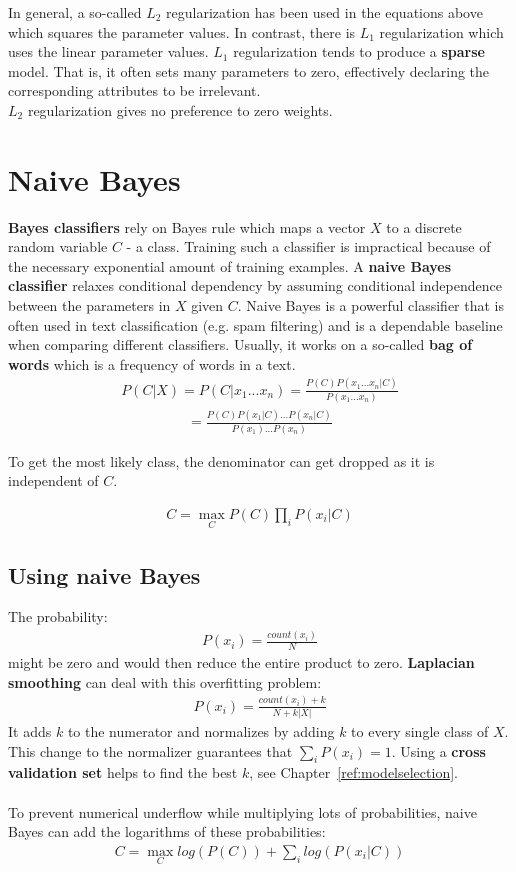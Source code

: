 \documentclass{report}
\begin{document}
In general, a so-called $L_2$ regularization has been used in the equations above which squares the parameter values.
In contrast, there is $L_1$ regularization which uses the linear parameter values.
$L_1$ regularization tends to produce a {\bf sparse} model.
That is, it often sets many parameters to zero, effectively declaring the corresponding attributes to be irrelevant. \\
$L_2$ regularization gives no preference to zero weights.


\section{Naive Bayes}
{\bf Bayes classifiers} rely on Bayes rule which maps a vector $X$ to a discrete random variable $C$ - a class. Training such a classifier is impractical because of the necessary exponential amount of training examples. A {\bf naive Bayes classifier} relaxes conditional dependency by assuming conditional independence between the parameters in $X$ given $C$. Naive Bayes is a powerful classifier that is often used in text classification (e.g. spam filtering) and is a dependable baseline when comparing different classifiers. Usually, it works on a so-called {\bf bag of words} which is a frequency of words in a text.
\begin{align*}
P(C\vert X) = P(C\vert x_1...x_n) = \frac{P(C)P(x_1...x_n\vert C)}{P(x_1...x_n)}
\end{align*}
\begin{align*}
= \frac{P(C)P(x_1\vert C)...P(x_n\vert C)}{P(x_1)...P(x_n)}
\end{align*}

To get the most likely class, the denominator can get dropped as it is independent of $C$.

\begin{align*}
C = \max\limits_{C} P(C)\prod_iP(x_i\vert C)
\end{align*}

\subsection{Using naive Bayes}
\label{chapter:usingnaivebayes}
The probability:
\begin{align*}
P(x_i) = \frac{count(x_i)}{N}
\end{align*}
might be zero and would then reduce the entire product to zero. {\bf Laplacian smoothing} can deal with this overfitting problem:
\begin{align*}
P(x_i) = \frac{count(x_i)+k}{N+k\vert X\vert}
\end{align*}
It adds $k$ to the numerator and normalizes by adding $k$ to every single class of $X$. This change to the normalizer guarantees that $\sum_i P(x_i) = 1$.
Using a {\bf cross validation set} helps to find the best $k$, see Chapter~\ref{ref:modelselection}.
\\
\\
To prevent numerical underflow while multiplying lots of probabilities, naive Bayes can add the logarithms of these probabilities:
\begin{align*}
C = \max\limits_{C} log(P(C))+\sum_i log(P(x_i\vert C))
\end{align*}
\end{document}

